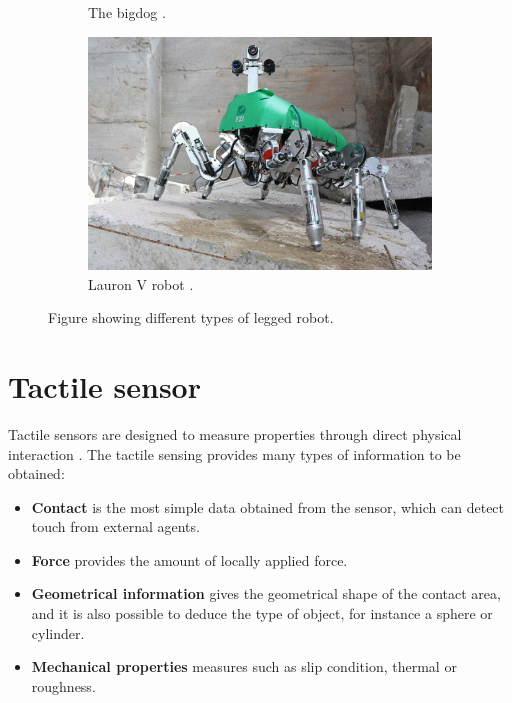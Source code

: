 \documentclass[USenglish]{ifimaster}  %
\begin{document}
\begin{figure}
\begin{subfigure}[b]{0.22\textwidth}
		\caption{The bigdog \cite{Raibert200810822}.}
		\label{fig:bigDog}
	\end{subfigure}\hfill
	\begin{subfigure}[b]{0.22\textwidth}
		\centering
		\includegraphics[width=\linewidth]{Figures/Lauron}
		\caption{Lauron V robot \cite{6878051}.}
		\label{fig:LAURON}
	\end{subfigure}
	\caption{Figure showing different types of legged robot.}\label{fig:robots}
\end{figure}

\FloatBarrier


\section{Tactile sensor}
Tactile sensors are designed to measure properties through direct physical interaction \cite{Cutkosky2008}. The tactile sensing provides many types of information to be obtained:

\begin{itemize}
	\item \textbf{Contact} is the most simple data obtained from the sensor, which can detect touch from external agents. 
	\item \textbf{Force} provides the amount of locally applied force.
	\item \textbf{Geometrical information} gives the geometrical shape of the contact area, and it is also possible to deduce the type of object, for instance a sphere or cylinder.
	\item \textbf{Mechanical properties} measures such as slip condition, thermal or roughness.
\end{itemize}
\end{document}
